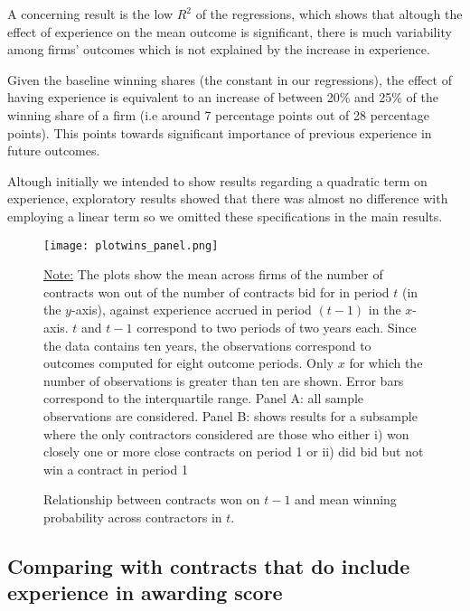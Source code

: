 A concerning result is the low $R^2$ of the regressions, which shows that altough the effect of experience on the mean outcome is significant, there is much variability among firms' outcomes which is not explained by the increase in experience.

Given the baseline winning shares (the constant in our regressions), the effect of having experience is equivalent to an increase of between 20\% and 25\% of the winning share of a firm (i.e around 7 percentage points out of 28 percentage points). This points towards significant importance of previous experience in future outcomes.

Altough initially we intended to show results regarding a quadratic term on experience, exploratory results showed that there was almost no difference with employing a linear term so we omitted these specifications in the main results.

\begin{figure}
  \texttt{[image: plotwins\_panel.png]}
  \caption{Relationship between contracts won on $t-1$ and mean winning probability across contractors in $t$.}
  \label{fig:plotresults_both}
  \vskip 0.5mm
  { \footnotesize \underline{Note:} The plots show the mean across firms of the number of contracts won out of the number of contracts bid for in period $t$ (in the $y$-axis), against experience accrued in period $(t-1)$ in the $x$-axis. $t$ and $t-1$ correspond to two periods of two years each. Since the data contains ten years, the observations correspond to outcomes computed for eight outcome periods.  Only $x$ for which the number of observations is greater than ten are shown. Error bars correspond to the interquartile range. Panel A: all sample observations are considered. Panel B:  shows results for a subsample where the only contractors considered are those who either i) won closely one or more close contracts  on period 1 or ii) did bid but not win a contract in period 1\par}
\end{figure}
\clearpage





\clearpage

\subsection{Comparing with contracts that do include experience in awarding score}

